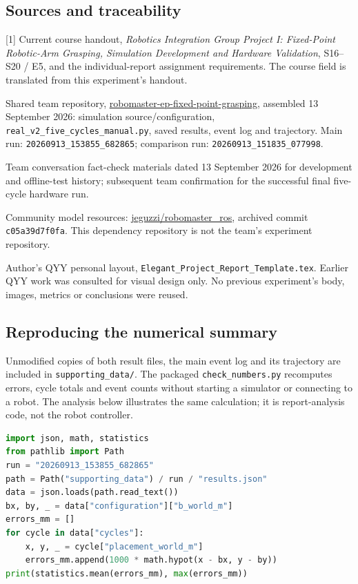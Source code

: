 \documentclass[11pt,a4paper]{article}
\newcommand{\code}[1]{{\small\nolinkurl{#1}}}
\begin{document}
\subsection{Sources and traceability}
{\small
[1] Current course handout, \emph{Robotics Integration Group Project I:
Fixed-Point Robotic-Arm Grasping, Simulation Development and Hardware
Validation}, S16--S20 / E5, and the individual-report assignment requirements.
The course field is translated from this experiment's handout.\par
[2] Shared team repository,
\href{https://github.com/ccx8kg5qpd-debug/robomaster-ep-fixed-point-grasping}
{robomaster-ep-fixed-point-grasping}, assembled 13 September 2026:
simulation source/configuration, \code{real_v2_five_cycles_manual.py}, saved
results, event log and trajectory. Main run: \code{20260913_153855_682865};
comparison run: \code{20260913_151835_077998}.\par
[3] Team conversation fact-check materials dated 13 September 2026 for
development and offline-test history; subsequent team confirmation for the
successful final five-cycle hardware run.\par
[4] Community model resources: \href{https://github.com/jeguzzi/robomaster_ros}
{jeguzzi/robomaster\_ros}, archived commit \code{c05a39d7f0fa}.
This dependency repository is not the team's experiment repository.\par
[5] Author's QYY personal layout, \code{Elegant_Project_Report_Template.tex}.
Earlier QYY work was consulted for visual design only. No previous experiment's
body, images, metrics or conclusions were reused.\par
}

\subsection{Reproducing the numerical summary}
Unmodified copies of both result files, the main event log and its trajectory
are included in \code{supporting_data/}. The packaged \code{check_numbers.py}
recomputes errors, cycle totals and event counts without starting a simulator
or connecting to a robot. The analysis below illustrates the same calculation;
it is report-analysis code, not the robot controller.

\begin{lstlisting}[language=Python,caption={Horizontal-error calculation from the saved main-run record}]
import json, math, statistics
from pathlib import Path
run = "20260913_153855_682865"
path = Path("supporting_data") / run / "results.json"
data = json.loads(path.read_text())
bx, by, _ = data["configuration"]["b_world_m"]
errors_mm = []
for cycle in data["cycles"]:
    x, y, _ = cycle["placement_world_m"]
    errors_mm.append(1000 * math.hypot(x - bx, y - by))
print(statistics.mean(errors_mm), max(errors_mm))
\end{lstlisting}
\end{document}
